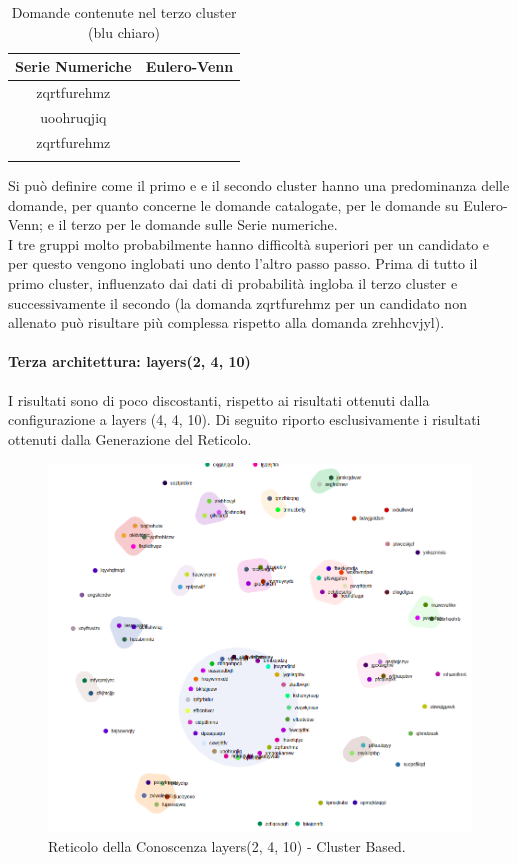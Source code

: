 \begin{longtable}{|c|c|}
	\hline
	\textbf{Serie Numeriche} & \textbf{Eulero-Venn} \\\hline\hline
	zqrtfurehmz &  \\
	uoohruqjiq  & \\
	zqrtfurehmz & \\
	
\hline
\caption{Domande contenute nel terzo cluster (blu chiaro)}\label{tab:Domande contenute nel terzo cluster}
\end{longtable}
\noindent
Si pu\`o definire come il primo e e il secondo cluster hanno una predominanza delle domande, per quanto concerne le domande catalogate, per le domande su Eulero-Venn; e il terzo per le domande sulle Serie numeriche.\\
I tre gruppi molto probabilmente hanno difficolt\`a superiori per un candidato e per questo vengono inglobati uno dento l'altro passo passo.
Prima di tutto il primo cluster, influenzato dai dati di probabilit\`a ingloba il terzo cluster  e successivamente il secondo (la domanda zqrtfurehmz per un candidato non allenato pu\`o risultare pi\`u complessa rispetto alla domanda zrehhcvjyl).

\paragraph{Terza architettura: layers(2, 4, 10)}\mbox{}
\label{Terza architettura}
\noindent
I risultati sono di poco discostanti, rispetto ai risultati ottenuti dalla configurazione a layers (4, 4, 10). Di seguito riporto esclusivamente i risultati ottenuti dalla Generazione del Reticolo.

\begin{figure}[H]
\centering
	\includegraphics[width=0.70\linewidth]{./image/logica(2,4,10).png}
	\caption{Reticolo della Conoscenza layers(2, 4, 10) - Cluster Based.}
	\label{Reticolo della Conoscenza layers(2, 4, 10) - Cluster Based.}
\end{figure}
\noindent

